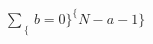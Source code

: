\documentclass[preview]{standalone}
\begin{document}
\begin{align*}
\sum _ \{b=0\} ^ \{N-a-1\}
\end{align*}
\end{document}
